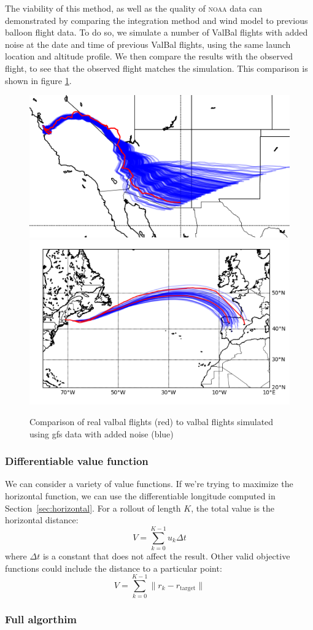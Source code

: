 \documentclass[11pt]{scrartcl} %
\begin{document}
The viability of this method, as well as the quality of \textsc{noaa} data can demonstrated by comparing the integration method and wind model to previous balloon flight data. To do so, we simulate a number of ValBal flights with added noise at the date and time of previous ValBal flights, using the same launch location and altitude profile. We then compare the results with the observed flight, to see that the observed flight matches the simulation. This comparison is shown in figure \ref{winds}.

\begin{figure}[h]
\includegraphics[width=0.45\linewidth]{winds.png}
\includegraphics[width=0.45\linewidth]{spain.png}
\caption{Comparison of real valbal flights (red) to valbal flights simulated using gfs data with added noise (blue)}
\label{winds}
\end{figure}

\subsubsection{Differentiable value function}
We can consider a variety of value functions. If we're trying to maximize the horizontal function, we can use the differentiable longitude computed in Section~\ref{sec:horizontal}. For a rollout of length $K$, the total value is the horizontal distance:
\begin{equation}
V = \sum_{k=0}^{K-1} u_k \Delta t\label{eqn:value}
\end{equation}
where $\Delta t$ is a constant that does not affect the result. Other valid objective functions could include the distance to a particular point:
\[V = \sum_{k=0}^{K-1} \lVert r_k - r_\text{target}\rVert\]

\subsubsection{Full algorthim}
\end{document}
